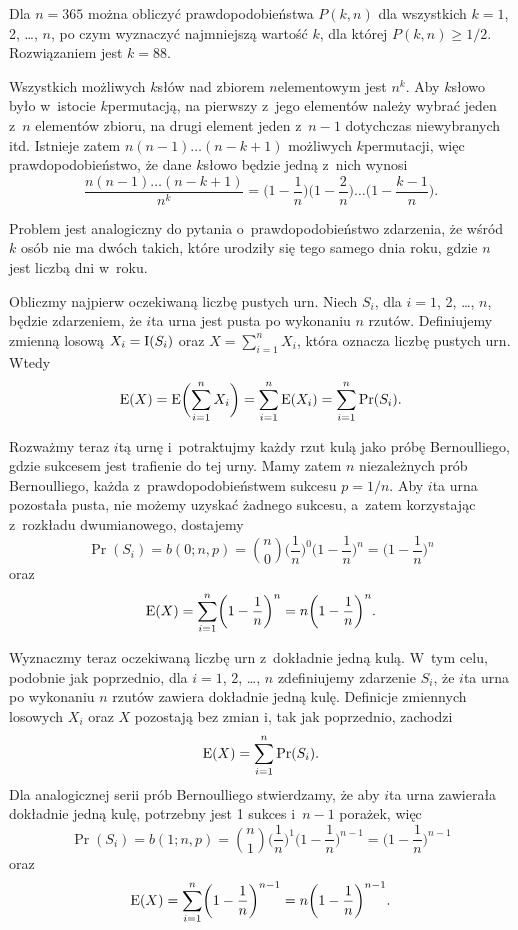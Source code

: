 Dla $n=365$ można obliczyć prawdopodobieństwa $P(k,n)$ dla wszystkich $k=1$, 2, \dots, $n$, po czym wyznaczyć najmniejszą wartość $k$, dla której $P(k,n)\ge1/2$.
Rozwiązaniem jest $k=88$.

\exercise %
Wszystkich możliwych $k$\nbhyphen słów nad zbiorem $n$\nbhyphen elementowym jest $n^k$.
Aby $k$\nbhyphen słowo było w~istocie $k$\nbhyphen permutacją, na pierwszy z~jego elementów należy wybrać jeden z~$n$ elementów zbioru, na drugi element jeden z~$n-1$ dotychczas niewybranych itd.
Istnieje zatem $n(n-1)\dots(n-k+1)$ możliwych $k$\nbhyphen permutacji, więc prawdopodobieństwo, że dane $k$\nbhyphen słowo będzie jedną z~nich wynosi
\[
	\frac{n(n-1)\dots(n-k+1)}{n^k} = \biggl(1-\frac{1}{n}\biggr)\biggl(1-\frac{2}{n}\biggr)\dots\biggl(1-\frac{k-1}{n}\biggr).
\]

Problem jest analogiczny do pytania o~prawdopodobieństwo zdarzenia, że wśród $k$ osób nie ma dwóch takich, które urodziły się tego samego dnia roku, gdzie $n$ jest liczbą dni w~roku.

\exercise %
Obliczmy najpierw oczekiwaną liczbę pustych urn.
Niech $S_i$, dla $i=1$, 2, \dots, $n$, będzie zdarzeniem, że $i$\nbhyphen ta urna jest pusta po wykonaniu $n$ rzutów.
Definiujemy zmienną losową $X_i=\operatorname{I}(S_i)$ oraz $X=\sum_{i=1}^nX_i$, która oznacza liczbę pustych urn.
Wtedy
\[
	\operatorname{E}(X) = \operatorname{E}\biggl(\sum_{i=1}^nX_i\biggr) = \sum_{i=1}^n\operatorname{E}(X_i) = \sum_{i=1}^n\Pr(S_i).
\]

Rozważmy teraz $i$\nbhyphen tą urnę i~potraktujmy każdy rzut kulą jako próbę Bernoulliego, gdzie sukcesem jest trafienie do tej urny.
Mamy zatem $n$ niezależnych prób Bernoulliego, każda z~prawdopodobieństwem sukcesu $p=1/n$.
Aby $i$\nbhyphen ta urna pozostała pusta, nie możemy uzyskać żadnego sukcesu, a~zatem korzystając z~rozkładu dwumianowego, dostajemy
\[
	\Pr(S_i) = b(0;n,p) = \binom{n}{0}\biggl(\frac{1}{n}\biggr)^0\biggl(1-\frac{1}{n}\biggr)^n = \biggl(1-\frac{1}{n}\biggr)^n
\]
oraz
\[
	\operatorname{E}(X) = \sum_{i=1}^n\biggl(1-\frac{1}{n}\biggr)^n = n\biggl(1-\frac{1}{n}\biggr)^n.
\]

Wyznaczmy teraz oczekiwaną liczbę urn z~dokładnie jedną kulą.
W~tym celu, podobnie jak poprzednio, dla $i=1$, 2, \dots, $n$ zdefiniujemy zdarzenie $S_i$, że $i$\nbhyphen ta urna po wykonaniu $n$ rzutów zawiera dokładnie jedną kulę.
Definicje zmiennych losowych $X_i$ oraz $X$ pozostają bez zmian i, tak jak poprzednio, zachodzi
\[
	\operatorname{E}(X) = \sum_{i=1}^n\Pr(S_i).
\]
Dla analogicznej serii prób Bernoulliego stwierdzamy, że aby $i$\nbhyphen ta urna zawierała dokładnie jedną kulę, potrzebny jest 1 sukces i~$n-1$ porażek, więc
\[
	\Pr(S_i) = b(1;n,p) = \binom{n}{1}\biggl(\frac{1}{n}\biggr)^1\biggl(1-\frac{1}{n}\biggr)^{n-1} = \biggl(1-\frac{1}{n}\biggr)^{n-1}
\]
oraz
\[
	\operatorname{E}(X) = \sum_{i=1}^n\biggl(1-\frac{1}{n}\biggr)^{n-1} = n\biggl(1-\frac{1}{n}\biggr)^{n-1}.
\]

